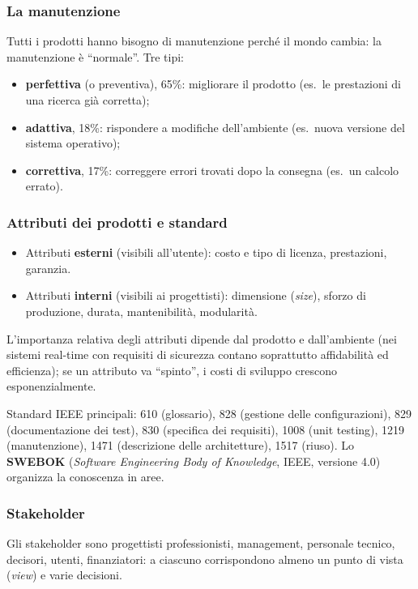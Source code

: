 \documentclass[a4paper,12pt]{article}
\begin{document}
\subsubsection{La manutenzione}
Tutti i prodotti hanno bisogno di manutenzione perché il mondo cambia: la manutenzione è
``normale''. Tre tipi:
\begin{itemize}
  \item \textbf{perfettiva} (o preventiva), 65\%: migliorare il prodotto (es.\ le
        prestazioni di una ricerca già corretta);
  \item \textbf{adattiva}, 18\%: rispondere a modifiche dell'ambiente (es.\ nuova versione
        del sistema operativo);
  \item \textbf{correttiva}, 17\%: correggere errori trovati dopo la consegna (es.\ un
        calcolo errato).
\end{itemize}

\subsubsection{Attributi dei prodotti e standard}
\begin{itemize}
  \item Attributi \textbf{esterni} (visibili all'utente): costo e tipo di licenza,
        prestazioni, garanzia.
  \item Attributi \textbf{interni} (visibili ai progettisti): dimensione (\emph{size}),
        sforzo di produzione, durata, mantenibilità, modularità.
\end{itemize}
L'importanza relativa degli attributi dipende dal prodotto e dall'ambiente (nei sistemi
real-time con requisiti di sicurezza contano soprattutto affidabilità ed efficienza); se
un attributo va ``spinto'', i costi di sviluppo crescono esponenzialmente.

Standard IEEE principali: 610 (glossario), 828 (gestione delle configurazioni), 829
(documentazione dei test), 830 (specifica dei requisiti), 1008 (unit testing), 1219
(manutenzione), 1471 (descrizione delle architetture), 1517 (riuso). Lo \textbf{SWEBOK}
(\emph{Software Engineering Body of Knowledge}, IEEE, versione 4.0) organizza la
conoscenza in aree.

\subsubsection{Stakeholder}
Gli stakeholder sono progettisti professionisti, management, personale tecnico, decisori,
utenti, finanziatori: a ciascuno corrispondono almeno un punto di vista (\emph{view}) e
varie decisioni.
\end{document}
